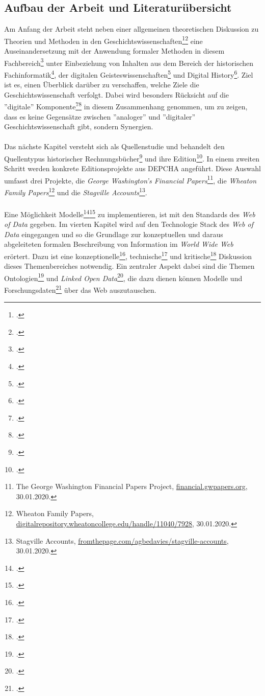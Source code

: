 \documentclass[12pt,a4paper]{article}
\begin{document}
\subsection{Aufbau der Arbeit und Literaturübersicht}
Am Anfang der Arbeit steht neben einer allgemeinen theoretischen Diskussion zu Theorien und Methoden in den Geschichtswissenschaften\footcite{jordan2018theorien}\footcite{hardtwig1990geschichtskultur} eine Auseinandersetzung mit der Anwendung formaler Methoden in diesem Fachbereich\footcite{thaller2017ungefahre} unter Einbeziehung von Inhalten aus dem Bereich der historischen Fachinformatik\footcite{thaller2017historical}, der digitalen Geisteswissenschaften\footcite{jannidis2017digital} und Digital History\footcite{graham2015exploring}. Ziel ist es, einen Überblick darüber zu verschaffen, welche Ziele die Geschichtswissenschaft verfolgt. Dabei wird besonders Rücksicht auf die ''digitale'' Komponente\footcite{fohr2017historische}\footcite{wintergrun2019netzwerkanalysen} in diesem Zusammenhang genommen, um zu zeigen, dass es keine Gegensätze zwischen ''analoger'' und ''digitaler'' Geschichtswissenschaft gibt, sondern Synergien.
\\
\\
Das nächste Kapitel versteht sich als Quellenstudie und behandelt den Quellentypus historischer Rechnungsbücher\footcite{gleba2015wirtschafts} und ihre Edition\footcite{vogeler2015mittelalterliche}. In einem zweiten Schritt werden konkrete Editionsprojekte aus DEPCHA angeführt. Diese Auswahl umfasst drei Projekte, die \textit{George Washington’s Financial Papers}\footnote{The George Washington Financial Papers Project, \url{financial.gwpapers.org}, 30.01.2020.}, die \textit{Wheaton Family Papers}\footnote{Wheaton Family Papers, \url{digitalrepository.wheatoncollege.edu/handle/11040/7928}, 30.01.2020.} und die \textit{Stagville Accounts}\footnote{Stagville Accounts, \url{fromthepage.com/agbedavies/stagville-accounts}, 30.01.2020.}.
\\
\\
Eine Möglichkeit Modelle\footcite[][]{stachowiak1973allgemeine}\footcite{mccarty2004modeling} zu implementieren, ist mit den Standards des \textit{Web of Data} gegeben. Im vierten Kapitel wird auf den Technologie Stack des \textit{Web of Data} eingegangen und so die Grundlage zur konzeptuellen und daraus abgeleiteten formalen Beschreibung von Information im \textit{World Wide Web} erörtert. Dazu ist eine konzeptionelle\footcite{berners2001semantic}, technische\footcite{bernstein2016new} und kritische\footcite{swartz2013aaron} Diskussion dieses Themenbereiches notwendig. Ein zentraler Aspekt dabei sind die Themen Ontologien\footcite{stuckenschmidt2009ontologien} und \textit{Linked Open Data}\footcite{bauer2011linked}, die dazu dienen können Modelle und Forschungsdaten\footcite{neher2011semantische} über das Web auszutauschen.
\end{document}
